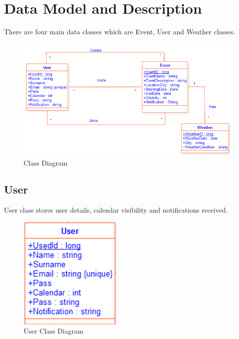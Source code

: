 \newpage
\section{Data Model and Description}
\quad There are four main data classes which are Event, User and Weather classes.
\begin{figure}[tbh]
  \begin{center}
  \includegraphics[width=150mm]{ClassDiagram}
  \caption{Class Diagram}\label{Fig :}
  \end{center}
\end{figure}

\subsection{User}
\quad User class stores user details, calendar visibility and notifications received.
\begin{figure}[tbh]
  \begin{center}
  \includegraphics[width=50mm]{UserClassDiagram}
  \caption{User Class Diagram}\label{Fig :}
  \end{center}
\end{figure}

